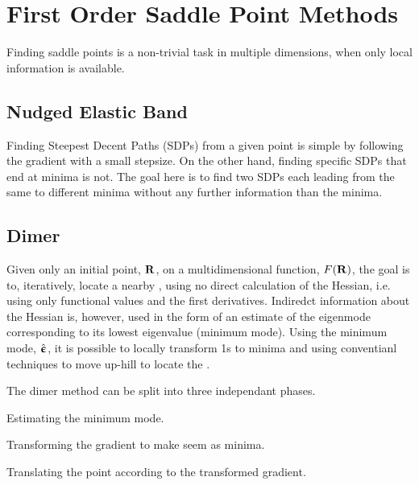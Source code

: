 \section{First Order Saddle Point Methods}
\label{sec:sps}

Finding saddle points is a non-trivial task in multiple dimensions, when only local information is available.

\incomplete

\subsection{Nudged Elastic Band}
\label{sec:neb}

Finding Steepest Decent Paths (SDPs) from a given point is simple by following the gradient with a small stepsize.
On the other hand, finding specific SDPs that end at minima is not.
The goal here is to find two SDPs each leading from the same  to different minima without any further information than the minima.


\incomplete

\subsection{Dimer}
\label{sec:dimer}

Given only an initial point, ${\mathrm{\mathbf{\bm{R}}}}$, on a multidimensional function, $F({\mathrm{\mathbf{\bm{R}}}})$, the goal is to, iteratively, locate a nearby , using no direct calculation of the Hessian, i.e. using only functional values and the first derivatives.
Indiredct information about the Hessian is, however, used in the form of an estimate of the eigenmode corresponding to its lowest eigenvalue (minimum mode).
Using the minimum mode, $\hat{{\mathrm{\mathbf{\bm{\upepsilon}}}}}$, it is possible to locally transform \sap1s to minima and using conventianl techniques to move up-hill to locate the .

The dimer method can be split into three independant phases.
\item Estimating the minimum mode.
\item Transforming the gradient to make  seem as minima.
\item Translating the point according to the transformed gradient.
\een

